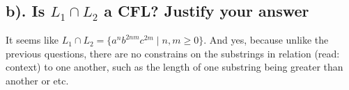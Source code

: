 \documentclass[20pt]{article} %
\begin{document}
\subsection{b). Is $L_1 \cap L_2$ a CFL? Justify your answer}
It seems like $L_1 \cap L_2 = \{ a^{n}b^{2nm}c^{2m} \mid n,m \geq 0 \}$.  And yes, because unlike the previous questions, there are no constrains on the substrings in relation (read: context) to one another, such as the length of one substring being greater than another or etc.
\end{document}
